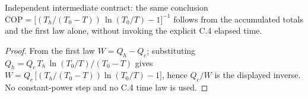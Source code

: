 \begin{theorem}
\label{thm:IPhO2026Problems_problem_IPhO_2026_3_C_5:coefficient_of_performance_via_energy_balance}
Independent intermediate contract: the same conclusion
$\mathrm{COP} = \bigl[(T_h/(T_0 - T))\,\ln(T_0/T) - 1\bigr]^{-1}$ follows
from the accumulated totals and the first law alone, without invoking the
explicit C.4 elapsed time.
\end{theorem}
\begin{proof}
From the first law $W = Q_h - Q_c$; substituting
$Q_h = Q_c\,T_h\,\ln(T_0/T)/(T_0 - T)$ gives
$W = Q_c\,\bigl[(T_h/(T_0 - T))\ln(T_0/T) - 1\bigr]$, hence $Q_c/W$ is the
displayed inverse. No constant-power step and no C.4 time law is used.
\end{proof}
